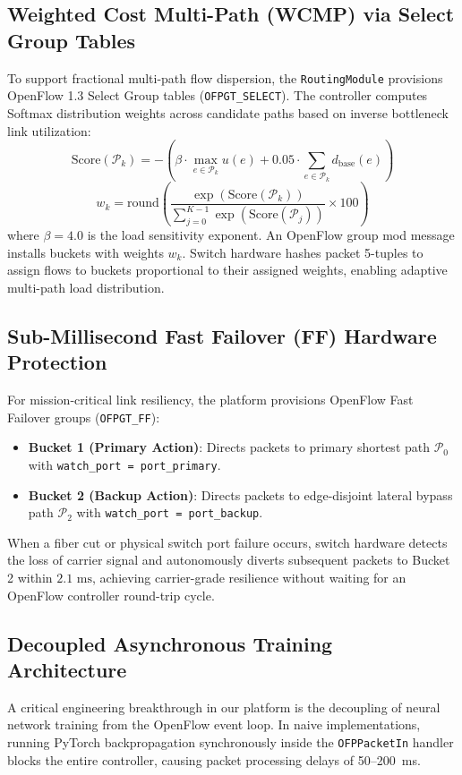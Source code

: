 \documentclass[12pt,a4paper,oneside]{report}
\begin{document}
\subsection{Weighted Cost Multi-Path (WCMP) via Select Group Tables}
To support fractional multi-path flow dispersion, the \texttt{RoutingModule} provisions OpenFlow 1.3 Select Group tables (\texttt{OFPGT\_SELECT}). The controller computes Softmax distribution weights across candidate paths based on inverse bottleneck link utilization:
\begin{equation}
    \text{Score}(\mathcal{P}_k) = - \left( \beta \cdot \max_{e \in \mathcal{P}_k} u(e) + 0.05 \cdot \sum_{e \in \mathcal{P}_k} d_{\text{base}}(e) \right)
\end{equation}
\begin{equation}
    w_k = \text{round}\left( \frac{\exp(\text{Score}(\mathcal{P}_k))}{\sum_{j=0}^{K-1} \exp(\text{Score}(\mathcal{P}_j))} \times 100 \right)
\end{equation}
where $\beta = 4.0$ is the load sensitivity exponent. An OpenFlow group mod message installs buckets with weights $w_k$. Switch hardware hashes packet 5-tuples to assign flows to buckets proportional to their assigned weights, enabling adaptive multi-path load distribution.

\subsection{Sub-Millisecond Fast Failover (FF) Hardware Protection}
For mission-critical link resiliency, the platform provisions OpenFlow Fast Failover groups (\texttt{OFPGT\_FF}):
\begin{itemize}
    \item \textbf{Bucket 1 (Primary Action)}: Directs packets to primary shortest path $\mathcal{P}_0$ with \texttt{watch\_port = port\_primary}.
    \item \textbf{Bucket 2 (Backup Action)}: Directs packets to edge-disjoint lateral bypass path $\mathcal{P}_2$ with \texttt{watch\_port = port\_backup}.
\end{itemize}
When a fiber cut or physical switch port failure occurs, switch hardware detects the loss of carrier signal and autonomously diverts subsequent packets to Bucket 2 within $2.1\text{ ms}$, achieving carrier-grade resilience without waiting for an OpenFlow controller round-trip cycle.

\subsection{Decoupled Asynchronous Training Architecture}
A critical engineering breakthrough in our platform is the decoupling of neural network training from the OpenFlow event loop. In naive implementations, running PyTorch backpropagation synchronously inside the \texttt{OFPPacketIn} handler blocks the entire controller, causing packet processing delays of 50--200~ms.
\end{document}
